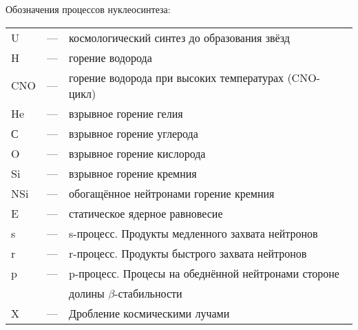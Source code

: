 \documentclass[a5paper,openany]{book}
\begin{document}
Обозначения  процессов нуклеосинтеза:\\
{
	\begin{tabular}{lcl}
		U & --- & космологический синтез до образования звёзд \\
		H & --- & горение водорода \\
		CNO & --- & горение водорода при высоких температурах (CNO-цикл) \\
		He & --- & взрывное горение гелия \\	
		С & --- & взрывное горение углерода \\
		O & --- & взрывное горение кислорода \\
		Si & --- & взрывное горение кремния \\
		NSi & --- & обогащённое нейтронами горение кремния \\
		E & --- & статическое ядерное равновесие \\
		s & --- & s-процесс. Продукты медленного захвата нейтронов\\
		r & --- & r-процесс. Продукты быстрого захвата нейтронов\\
		p & --- & p-процесс. Процесы на обеднённой нейтронами стороне \\
		& & долины $\beta$-стабильности\\
		X & --- & Дробление космическими лучами \\
	\end{tabular}
} 
\end{document}
